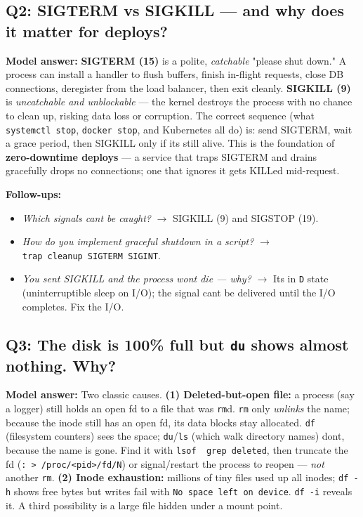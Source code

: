 \documentclass[11pt]{article}
\providecommand{\tightlist}{\setlength{\itemsep}{1pt}\setlength{\parskip}{0pt}}
\begin{document}
\subsection{Q2: SIGTERM vs SIGKILL --- and why does it matter for deploys?}\label{q2-sigterm-vs-sigkill--and-why-does-it-matter-for-deploys}

\textbf{Model answer:} \textbf{SIGTERM (15)} is a polite, \emph{catchable} "please shut down." A process can install a handler to flush buffers, finish in-flight requests, close DB connections, deregister from the load balancer, then exit cleanly. \textbf{SIGKILL (9)} is \emph{uncatchable and unblockable} --- the kernel destroys the process with no chance to clean up, risking data loss or corruption. The correct sequence (what \texttt{systemctl\ stop}, \texttt{docker\ stop}, and Kubernetes all do) is: send SIGTERM, wait a grace period, then SIGKILL only if it\textquotesingle s still alive. This is the foundation of \textbf{zero-downtime deploys} --- a service that traps SIGTERM and drains gracefully drops no connections; one that ignores it gets KILLed mid-request.

\textbf{Follow-ups:}

\begin{itemize}
\tightlist
\item
  \emph{Which signals can\textquotesingle t be caught?} \(\rightarrow\) SIGKILL (9) and SIGSTOP (19).
\item
  \emph{How do you implement graceful shutdown in a script?} \(\rightarrow\) \texttt{trap\ cleanup\ SIGTERM\ SIGINT}.
\item
  \emph{You sent SIGKILL and the process won\textquotesingle t die --- why?} \(\rightarrow\) It\textquotesingle s in \texttt{D} state (uninterruptible sleep on I/O); the signal can\textquotesingle t be delivered until the I/O completes. Fix the I/O.
\end{itemize}

\subsection{\texorpdfstring{Q3: The disk is 100\% full but \texttt{du} shows almost nothing. Why?}{Q3: The disk is 100\% full but du shows almost nothing. Why?}}\label{q3-the-disk-is-100-full-but-du-shows-almost-nothing-why}

\textbf{Model answer:} Two classic causes. \textbf{(1) Deleted-but-open file:} a process (say a logger) still holds an open fd to a file that was \texttt{rm}\textquotesingle d. \texttt{rm} only \emph{unlinks} the name; because the inode still has an open fd, its data blocks stay allocated. \texttt{df} (filesystem counters) sees the space; \texttt{du}/\texttt{ls} (which walk directory names) don\textquotesingle t, because the name is gone. Find it with \texttt{lsof\ \textbar{}\ grep\ deleted}, then truncate the fd (\texttt{:\ \textgreater{}\ /proc/\textless{}pid\textgreater{}/fd/N}) or signal/restart the process to reopen --- \emph{not} another \texttt{rm}. \textbf{(2) Inode exhaustion:} millions of tiny files used up all inodes; \texttt{df\ -h} shows free bytes but writes fail with \texttt{No\ space\ left\ on\ device}. \texttt{df\ -i} reveals it. A third possibility is a large file hidden under a mount point.
\end{document}
